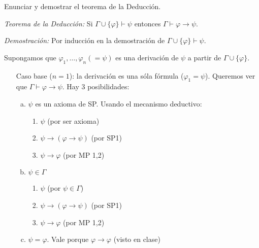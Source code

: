 \begin{questions}
\begin{solution}
\end{solution}


\question Enunciar y demostrar el teorema de la Deducci\'on. 

\begin{solution}

 {\it Teorema de la Deducci\'on: } Si $\Gamma\cup\{\varphi\}\vdash\psi$ entonces $\Gamma \vdash \varphi\rightarrow\psi$.
  
 {\it Demostraci\'on: } Por inducci\'on en la demostraci\'on de $\Gamma\cup\{\varphi\}\vdash\psi$.
 
 Supongamos que $\varphi_1, \dots, \varphi_n(=\psi)$ es una derivaci\'on de $\psi$ a partir de $\Gamma\cup\{\varphi\}$.
 
 \begin{itemize}[\quad]
  \item[Caso base ($n=1$):] la derivaci\'on es una s\'ola f\'ormula ($\varphi_1=\psi$). Queremos ver que $\Gamma\vdash\varphi\rightarrow\psi$. Hay 3 posibilidades: 
  \begin{enumerate}[a)]
   \item $\psi$ es un axioma de SP. Usando el mecanismo deductivo: 
    \begin{enumerate}[1.]
      \item $\psi$ (por ser axioma)
      \item $\psi\rightarrow(\varphi\rightarrow\psi)$  (por SP1)
      \item $\psi\rightarrow\varphi$ (por MP 1,2)
    \end{enumerate}
    
   \item $\psi\in\Gamma$
   \begin{enumerate}[1.]
      \item $\psi$ (por $\psi\in\Gamma$)
      \item $\psi\rightarrow(\varphi\rightarrow\psi)$  (por SP1)
      \item $\psi\rightarrow\varphi$ (por MP 1,2)
    \end{enumerate}
    
   \item $\psi=\varphi$. 
    Vale porque $\varphi\rightarrow\varphi$ (visto en clase)
  \end{enumerate}


\end{itemize}
\end{solution}
\end{questions}
